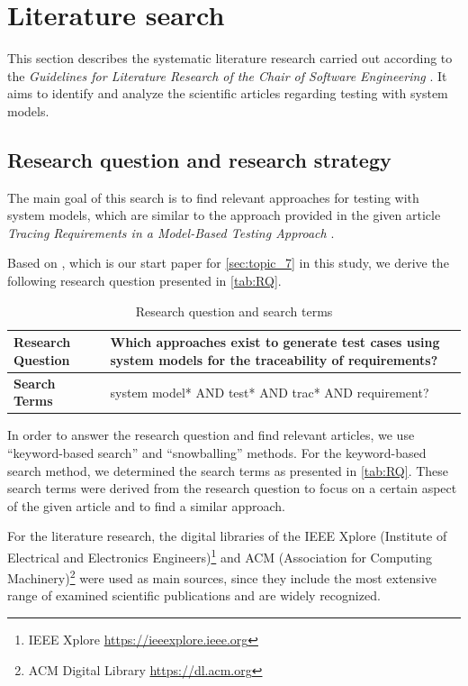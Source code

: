 \section{Literature search}
\label{sec:LS}

This section describes the systematic literature research carried out according to the \textit{Guidelines for Literature Research of the Chair of Software Engineering} \cite{LRGuidelines}. It aims to identify and analyze the scientific articles regarding testing with system models. 

\subsection*{Research question and research strategy}
\label{subsec:RQ}
The main goal of this search is to find relevant approaches for testing with system models, which are similar to the approach provided in the given article \textit{Tracing Requirements in a Model-Based Testing Approach} \cite{Paper1}. 

Based on \cite{Paper1}, which is our start paper for \autoref{sec:topic_7} in this study, we derive the following research question presented in \autoref{tab:RQ}.

\begin{table} [htb] 
\centering
\begin{small}
\caption{Research question and search terms}
\label{tab:RQ}
\setlength{\tabcolsep}{1em}
\begin{tabular}{ l| p{10cm}}
\hline
\textbf{Research Question} & Which approaches exist to generate test cases using system models for the traceability of requirements?\\
\hline
\textbf{Search Terms}  & system model* AND test* AND trac* AND requirement? \\
\hline
\end{tabular}
\end{small}
\end{table}

In order to answer the research question and find relevant articles, we use \enquote{keyword-based search} and \enquote{snowballing} methods. For the keyword-based search method, we determined the search terms as presented in \autoref{tab:RQ}. These search terms were derived from the research question to focus on a certain aspect of the given article \cite{Paper1} and to find a similar approach. 

For the literature research, the digital libraries of the IEEE Xplore (Institute of Electrical and Electronics Engineers)\footnote{IEEE Xplore \url{https://ieeexplore.ieee.org}} and ACM (Association for Computing Machinery)\footnote{ACM Digital Library \url{https://dl.acm.org}} were used as main sources, since they include the most extensive range of examined scientific publications and are widely recognized. 

